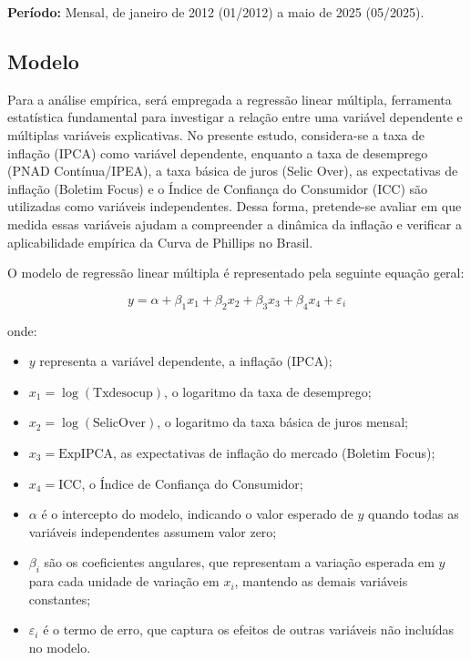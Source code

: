 \documentclass[12pt,oneside]{abntex2}
\begin{document}
\textbf{Período:} Mensal, de janeiro de 2012 (01/2012) a maio de 2025 (05/2025).
\medskip

\subsection{\textbf{Modelo}}

Para a análise empírica, será empregada a regressão linear múltipla, ferramenta estatística fundamental para investigar a relação entre uma variável dependente e múltiplas variáveis explicativas. No presente estudo, considera-se a taxa de inflação (IPCA) como variável dependente, enquanto a taxa de desemprego (PNAD Contínua/IPEA), a taxa básica de juros (Selic Over), as expectativas de inflação (Boletim Focus) e o Índice de Confiança do Consumidor (ICC) são utilizadas como variáveis independentes. Dessa forma, pretende-se avaliar em que medida essas variáveis ajudam a compreender a dinâmica da inflação e verificar a aplicabilidade empírica da Curva de Phillips no Brasil. 

O modelo de regressão linear múltipla é representado pela seguinte equação geral:

\[
y = \alpha + \beta_1 x_1 + \beta_2 x_2 + \beta_3 x_3 + \beta_4 x_4 + \varepsilon_i
\]

onde:
\begin{itemize}
    \item $y$ representa a variável dependente, a inflação (IPCA);
    \item $x_1 = \log(\text{Txdesocup})$, o logaritmo da taxa de desemprego;
    \item $x_2 = \log(\text{SelicOver})$, o logaritmo da taxa básica de juros mensal;
    \item $x_3 = \text{ExpIPCA}$, as expectativas de inflação do mercado (Boletim Focus);
    \item $x_4 = \text{ICC}$, o Índice de Confiança do Consumidor;
    \item $\alpha$ é o intercepto do modelo, indicando o valor esperado de $y$ quando todas as variáveis independentes assumem valor zero;
    \item $\beta_i$ são os coeficientes angulares, que representam a variação esperada em $y$ para cada unidade de variação em $x_i$, mantendo as demais variáveis constantes;
    \item $\varepsilon_i$ é o termo de erro, que captura os efeitos de outras variáveis não incluídas no modelo.
\end{itemize}
\end{document}
